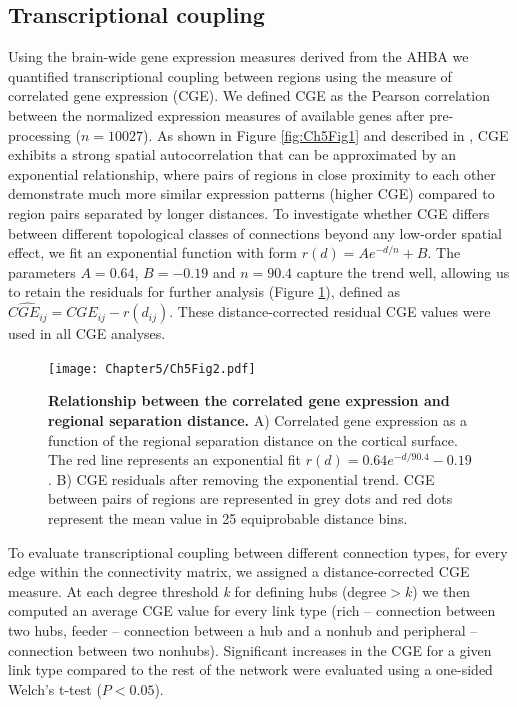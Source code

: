\subsection{Transcriptional coupling}
\label{sec:CGE}

Using the brain-wide gene expression measures derived from the AHBA we quantified transcriptional coupling between regions using the measure of correlated gene expression (CGE). We defined CGE as the Pearson correlation between the normalized expression measures of available genes after pre-processing ($n=\num{10027}$). As shown in Figure \ref{fig:Ch5Fig1} and described in \citep{Arnatkeviciute2019}, CGE exhibits a strong spatial autocorrelation that can be approximated by an exponential relationship, where pairs of regions in close proximity to each other demonstrate much more similar expression patterns (higher CGE) compared to region pairs separated by longer distances. To investigate whether CGE differs between different topological classes of connections beyond any low-order spatial effect, we fit an exponential function with form $r(d)=Ae^{-d/n}+B$. The parameters $A = 0.64$, $B = -0.19$ and $n=90.4$ capture the trend well, allowing us to retain the residuals for further analysis (Figure \ref{fig:Ch5Fig2}), defined as $\widehat{CGE_{ij}}=CGE_{ij} - r(d_{ij})$. These distance-corrected residual CGE values were used in all CGE analyses.

\begin{figure}[h!]
\begin{center}
\texttt{[image: Chapter5/Ch5Fig2.pdf]}%
\end{center}
\caption{\textbf{Relationship between the correlated gene expression and regional separation distance.}
A) Correlated gene expression as a function of the regional separation distance on the cortical surface. The red line represents an exponential fit $r(d)=0.64e^{-d/90.4}-0.19$. B) CGE residuals after removing the exponential trend. CGE between pairs of regions are represented in grey dots and red dots represent the mean value in 25 equiprobable distance bins.}
\label{fig:Ch5Fig2}
\end{figure}

To evaluate transcriptional coupling between different connection types, for every edge within the connectivity matrix, we assigned a distance-corrected CGE measure. At each degree threshold \textit{k} for defining hubs (degree$>k$) we then computed an average CGE value for every link type (rich – connection between two hubs, feeder – connection between a hub and a nonhub and peripheral – connection between two nonhubs). Significant increases in the CGE for a given link type compared to the rest of the network were evaluated using a one-sided Welch’s t-test ($P<0.05$).

